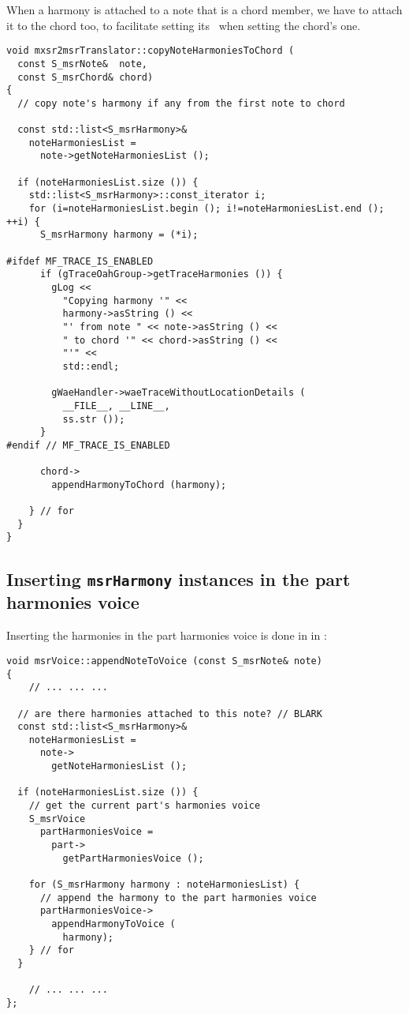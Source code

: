 When a harmony is attached to a note that is a chord member, we have to attach it to the chord too, to facilitate setting its \pim\ when setting the chord's one.
\begin{lstlisting}[language=CPlusPlus]
void mxsr2msrTranslator::copyNoteHarmoniesToChord (
  const S_msrNote&  note,
  const S_msrChord& chord)
{
  // copy note's harmony if any from the first note to chord

  const std::list<S_msrHarmony>&
    noteHarmoniesList =
      note->getNoteHarmoniesList ();

  if (noteHarmoniesList.size ()) {
    std::list<S_msrHarmony>::const_iterator i;
    for (i=noteHarmoniesList.begin (); i!=noteHarmoniesList.end (); ++i) {
      S_msrHarmony harmony = (*i);

#ifdef MF_TRACE_IS_ENABLED
      if (gTraceOahGroup->getTraceHarmonies ()) {
        gLog <<
          "Copying harmony '" <<
          harmony->asString () <<
          "' from note " << note->asString () <<
          " to chord '" << chord->asString () <<
          "'" <<
          std::endl;

        gWaeHandler->waeTraceWithoutLocationDetails (
          __FILE__, __LINE__,
          ss.str ());
      }
#endif // MF_TRACE_IS_ENABLED

      chord->
        appendHarmonyToChord (harmony);

    } // for
  }
}
\end{lstlisting}


\subsection{Inserting {\tt msrHarmony} instances in the part harmonies voice}

Inserting the harmonies in the part harmonies voice is done in  in :
\begin{lstlisting}[language=CPlusPlus]
void msrVoice::appendNoteToVoice (const S_msrNote& note)
{
	// ... ... ...

  // are there harmonies attached to this note? // BLARK
  const std::list<S_msrHarmony>&
    noteHarmoniesList =
      note->
        getNoteHarmoniesList ();

  if (noteHarmoniesList.size ()) {
    // get the current part's harmonies voice
    S_msrVoice
      partHarmoniesVoice =
        part->
          getPartHarmoniesVoice ();

    for (S_msrHarmony harmony : noteHarmoniesList) {
      // append the harmony to the part harmonies voice
      partHarmoniesVoice->
        appendHarmonyToVoice (
          harmony);
    } // for
  }

	// ... ... ...
};
\end{lstlisting}


